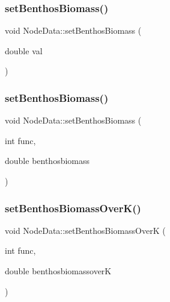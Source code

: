 \subsubsection{\texorpdfstring{setBenthosBiomass()}{setBenthosBiomass()}\hspace{0.1cm}{\footnotesize\ttfamily [1/2]}}
{\footnotesize\ttfamily void Node\+Data\+::set\+Benthos\+Biomass (\begin{DoxyParamCaption}\item[{double}]{val }\end{DoxyParamCaption})\hspace{0.3cm}{\ttfamily [inline]}}

\mbox{\label{class_node_data_a8cb0783f063c00339e45cf25e1724112}} 
\subsubsection{\texorpdfstring{setBenthosBiomass()}{setBenthosBiomass()}\hspace{0.1cm}{\footnotesize\ttfamily [2/2]}}
{\footnotesize\ttfamily void Node\+Data\+::set\+Benthos\+Biomass (\begin{DoxyParamCaption}\item[{int}]{func,  }\item[{double}]{benthosbiomass }\end{DoxyParamCaption})}

\mbox{\label{class_node_data_af1476c229f470b93181304ea0d9206c4}} 
\subsubsection{\texorpdfstring{setBenthosBiomassOverK()}{setBenthosBiomassOverK()}}
{\footnotesize\ttfamily void Node\+Data\+::set\+Benthos\+Biomass\+OverK (\begin{DoxyParamCaption}\item[{int}]{func,  }\item[{double}]{benthosbiomassoverK }\end{DoxyParamCaption})}

\mbox{\label{class_node_data_a60a20553a3f5eb184bf7e418bef3a551}} 
